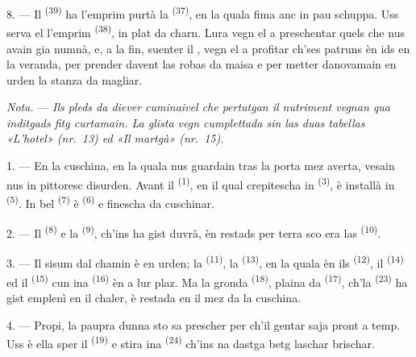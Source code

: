 8. --- Il  \textsuperscript{(39)} ha l'emprim purtà la
 \textsuperscript{(37)}, en la quala fima anc in pau schuppa. Uss
serva el l'emprim  \textsuperscript{(38)}, in plat da charn. Lura vegn el
a preschentar quels che nus avain gia numnà, e, a la fin, suenter il , vegn el a profitar ch'ses patruns èn ids en la veranda, per prender davent
las robas da maisa e per metter danovamain en urden la stanza da magliar.

\textit{Nota.} --- \textit{Ils pleds da diever cuminaivel che pertutgan il
nutriment vegnan qua inditgads fitg curtamain. La glista vegn cumplettada sin las
duas tabellas «L'hotel» (nr.~13) ed «Il martgà» (nr.~15).}

\VUsaut{4.6mm}
\VUsaut{3.0mm}

1. --- En la cuschina, en la quala nus guardain tras la porta mez averta, vesain nus
in pittoresc disurden. Avant il  \textsuperscript{(1)}, en il qual
crepitescha in  \textsuperscript{(3)}, è installà in 
\textsuperscript{(5)}. In bel  \textsuperscript{(7)} è  \textsuperscript{(6)} e finescha da cuschinar.

2. --- Il  \textsuperscript{(8)} e la 
\textsuperscript{(9)}, ch'ins ha gist duvrà, èn restads per terra sco era las
 \textsuperscript{(10)}.

3. --- Il sisum dal chamin è en urden; la  \textsuperscript{(11)}, la
 \textsuperscript{(13)}, en la quala èn ils
 \textsuperscript{(12)}, il 
\textsuperscript{(14)} ed il  \textsuperscript{(15)} cun ina
 \textsuperscript{(16)} èn a lur plaz. Ma la gronda  \textsuperscript{(18)}, plaina da 
\textsuperscript{(17)}, ch'la  \textsuperscript{(23)} ha gist
emplenì en il chaler, è restada en il mez da la cuschina.

4. --- Propi, la paupra dunna sto sa prescher per ch'il gentar saja pront a temp.
Uss è ella sper il  \textsuperscript{(19)} e stira ina
 \textsuperscript{(24)} ch'ins na dastga betg laschar brischar.

